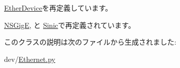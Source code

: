 \hyperlink{classEthernet_1_1EtherDevice_acce15679d830831b0bbe8ebc2a60b2ca}{EtherDevice}を再定義しています。

\hyperlink{classEthernet_1_1NSGigE_acce15679d830831b0bbe8ebc2a60b2ca}{NSGigE}, と \hyperlink{classEthernet_1_1Sinic_acce15679d830831b0bbe8ebc2a60b2ca}{Sinic}で再定義されています。

このクラスの説明は次のファイルから生成されました:\begin{DoxyCompactItemize}
\item 
dev/\hyperlink{Ethernet_8py}{Ethernet.py}\end{DoxyCompactItemize}
